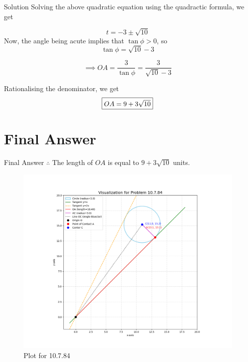 \documentclass{beamer}
\theoremstyle{remark}
\begin{document}
\begin{frame}{Solution}
    Solving the above quadratic equation using the quadractic formula, we get

\begin{equation}
    t = -3 \pm \sqrt{10}
\end{equation}
Now, the angle being acute implies that $\tan{\phi} > 0$, so
\begin{equation}
    \tan{\phi} = \sqrt{10} - 3
\end{equation}

\begin{equation}
    \implies OA = \frac{3}{\tan{\phi}} = \frac{3}{\sqrt{10} - 3}
\end{equation}

Rationalising the denominator, we get
\begin{equation}
    \fbox{$OA = 9 + 3\sqrt{10}$}
\end{equation}
\end{frame}

\section{Final Answer}
\begin{frame}{Final Answer}
$\therefore$ The length of $OA$ is equal to $9 + 3\sqrt{10}$ units.
\begin{figure}[H]
    \centering
    \includegraphics[width=0.60\columnwidth]{figs/2.png}
    \caption{Plot for 10.7.84}
\end{figure}
\end{frame}
\end{document}
